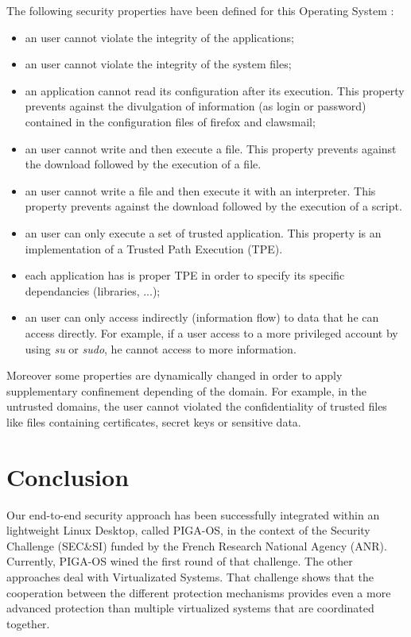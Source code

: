 \documentclass[conference]{IEEEtran}
\begin{document}
The following security properties have been defined for this Operating System :
\begin{itemize}
\item an user cannot violate the integrity of the applications;
\item an user cannot violate the integrity of the system files;
\item an application cannot read its configuration after its execution. This property prevents against the divulgation of information (as login or password) contained in the configuration files of firefox and clawsmail;
\item an user cannot write and then execute a file. This property prevents against the download followed by the execution of a file.  
\item an user cannot write a file and then execute it with an interpreter. This property prevents against the download followed by the execution of a script.
\item an user can only execute a set of trusted application. This property is an implementation of a Trusted Path Execution (TPE).
\item each application has is proper TPE in order to specify its specific dependancies (libraries, ...);
\item an user can only access indirectly (information flow) to data that he can access directly. For example, if a user access to a more privileged account by using \textit{su} or \textit{sudo}, he cannot access to more information.
\end{itemize}

Moreover some properties are dynamically changed in order to apply supplementary confinement depending of the domain.
For example, in the untrusted domains, the user cannot violated the confidentiality of trusted files like files containing certificates, secret keys or sensitive data.

\section{Conclusion}
Our end-to-end security approach has been successfully integrated within an lightweight Linux Desktop, called PIGA-OS, in the context of the Security Challenge (SEC\&SI)  funded by the French Research National Agency (ANR). Currently, PIGA-OS wined the first round of that challenge. The other approaches deal with Virtualizated Systems. That challenge shows that the cooperation between the different protection
mechanisms provides even a more advanced protection than multiple
virtualized systems that are coordinated together. 




\end{document}
